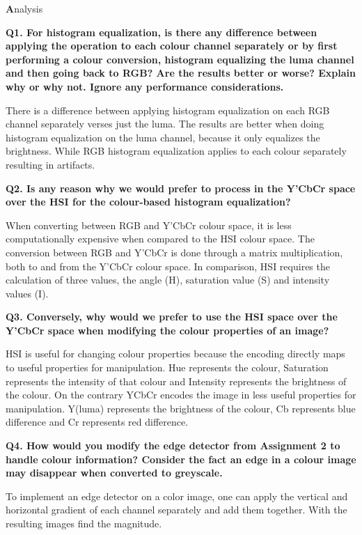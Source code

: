\documentclass[
]{article}
\begin{document}
\pagebreak
\textbf Analysis

\textbf {Q1. For histogram equalization, is there any difference between applying the operation to
each colour channel separately or by first performing a colour conversion, histogram equalizing
the luma channel and then going back to RGB? Are the results better or worse? Explain why or
why not. Ignore any performance considerations.}

There is a difference between applying histogram equalization on each RGB channel separately verses just the luma. The results are better when doing histogram equalization on the luma channel, because it only equalizes the brightness. While  RGB histogram equalization applies to each colour separately resulting in artifacts.

\textbf{Q2. Is any reason why we would prefer to process in the Y’CbCr space over the HSI for the
colour-based histogram equalization?}

When converting between RGB and Y'CbCr colour space, it is less computationally expensive when compared to the HSI colour space. The conversion between RGB and Y'CbCr is done through a matrix multiplication, both to and from the Y'CbCr colour space. In comparison, HSI requires the calculation of three values, the angle (H), saturation value (S) and intensity values (I). 


\textbf{Q3. Conversely, why would we prefer to use the HSI space over the Y’CbCr space when
modifying the colour properties of an image?}

HSI is useful for changing colour properties because the encoding directly maps to useful properties for manipulation. Hue represents the colour, Saturation represents the intensity of that colour and Intensity represents the brightness of the colour. On the contrary YCbCr encodes the image in less useful properties for manipulation. Y(luma) represents the brightness of the colour, Cb represents blue difference and Cr represents red difference.

\textbf{Q4. How would you modify the edge detector from Assignment 2 to handle colour information? Consider the fact an edge in a colour image may disappear when converted to greyscale.}

To implement an edge detector on a color image, one can apply the vertical and horizontal gradient of each channel separately and add them together. With the resulting images find the magnitude. 
\end{document}

